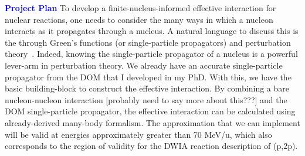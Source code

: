 \documentclass[12pt]{article}
\begin{document}
\textcolor{blue}{\textbf{Project Plan}}
To develop a finite-nucleus-informed effective interaction for nuclear reactions, one needs to consider the many ways in which a nucleon interacts as it propagates through a
nucleus. A natural language to discuss this is the through Green's functions (or single-particle propagators) and perturbation theory~\cite{Exposed!}. Indeed, knowing the
single-particle propagator of a nucleus is a powerful lever-arm in perturbation theory. We already have an accurate single-particle propagator from the DOM that I developed in my
PhD. With this, we have the basic building-block to construct the effective interaction. By combining a bare nucleon-nucleon interaction [probably need to say more about this???]
and the DOM single-particle propagator, the effective interaction can be calculated using already-derived many-body formalism.   
   The approximation that we can implement will be valid at energies approximately greater than 70 MeV/u, which also corresponds to the region of validity for the DWIA reaction
   description of (p,2p).  
\end{document}
